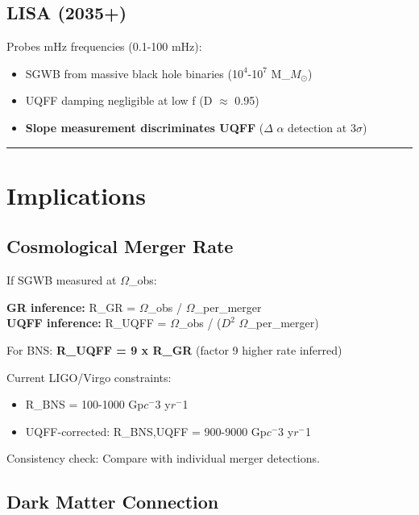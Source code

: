 \documentclass[12pt,a4paper]{article}
\begin{document}
\subsection{LISA (2035+)}

Probes mHz frequencies (0.1-100 mHz):

\begin{itemize}
  \item SGWB from massive black hole binaries (1$0^{4}$-1$0^{7}$ M\_{$M_{\odot}$})
  \item UQFF damping negligible at low f (D $\approx$ 0.95)
  \item \textbf{Slope measurement discriminates UQFF} ($\Delta$ $\alpha$ detection at 3$\sigma$)
\end{itemize}

\medskip\hrule\medskip

\section{Implications}

\subsection{Cosmological Merger Rate}

If SGWB measured at $\Omega$\_obs:

\begin{flushleft}
\textbf{GR inference:} R\_GR = $\Omega$\_obs / $\Omega$\_per\_merger \\
\textbf{UQFF inference:} R\_UQFF = $\Omega$\_obs / ($D^{2}$ $\Omega$\_per\_merger) \\
\end{flushleft}

For BNS: \textbf{R\_UQFF = 9 x R\_GR} (factor 9 higher rate inferred)

Current LIGO/Virgo constraints:

\begin{itemize}
  \item R\_BNS = 100-1000 Gp$c^{-}$3 y$r^{-}$1
  \item UQFF-corrected: R\_BNS,UQFF = 900-9000 Gp$c^{-}$3 y$r^{-}$1
\end{itemize}

Consistency check: Compare with individual merger detections.

\subsection{Dark Matter Connection}
\end{document}
